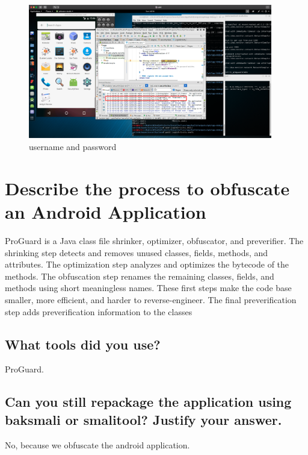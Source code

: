 \documentclass[onecolumn,oneside]{SUSTechHomework}
\begin{document}
    \begin{figure}[H]
      \centering
      \includegraphics[width=0.95\textwidth]{img/pic1.png}
      \caption{username and password}
    \end{figure}

  \section{Describe the process to obfuscate an Android Application}

  ProGuard is a Java class file shrinker, optimizer, obfuscator, and preverifier. The shrinking step detects and removes unused classes, fields, methods, and attributes. The optimization step analyzes and optimizes the bytecode of the methods. The obfuscation step renames the remaining classes, fields, and methods using short meaningless names. These first steps make the code base smaller, more efficient, and harder to reverse-engineer. The final preverification step adds preverification information to the classes

    \subsection{What tools did you use?}

    ProGuard.

    \subsection{Can you still repackage the application using baksmali or smalitool? Justify your answer.}

    No, because we obfuscate the android application.
\end{document}
